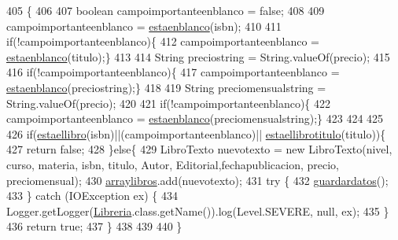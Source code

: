 \begin{DoxyCode}
405                                                                                                            
                     \{
406              
407              \textcolor{keywordtype}{boolean} campoimportanteenblanco = \textcolor{keyword}{false};
408              
409              campoimportanteenblanco = \mbox{\hyperlink{classlibreria_1_1_libreria_afca98a0ea16507ff5cc9bc0dde706abb}{estaenblanco}}(isbn);
410              
411              \textcolor{keywordflow}{if}(!campoimportanteenblanco)\{
412              campoimportanteenblanco = \mbox{\hyperlink{classlibreria_1_1_libreria_afca98a0ea16507ff5cc9bc0dde706abb}{estaenblanco}}(titulo);\}
413              
414              String preciostring = String.valueOf(precio);
415              
416              \textcolor{keywordflow}{if}(!campoimportanteenblanco)\{
417              campoimportanteenblanco = \mbox{\hyperlink{classlibreria_1_1_libreria_afca98a0ea16507ff5cc9bc0dde706abb}{estaenblanco}}(preciostring);\}
418              
419              String preciomensualstring = String.valueOf(precio);
420              
421              \textcolor{keywordflow}{if}(!campoimportanteenblanco)\{
422              campoimportanteenblanco = \mbox{\hyperlink{classlibreria_1_1_libreria_afca98a0ea16507ff5cc9bc0dde706abb}{estaenblanco}}(preciomensualstring);\}
423              
424              
425                  
426             \textcolor{keywordflow}{if}(\mbox{\hyperlink{classlibreria_1_1_libreria_a0af77d7fa2b6f3c0a0b218ee9df08ce3}{estaellibro}}(isbn)||(campoimportanteenblanco)||
      \mbox{\hyperlink{classlibreria_1_1_libreria_aec6380fd1bcff89fb0f2d6d4b4584598}{estaellibrotitulo}}(titulo))\{
427                 \textcolor{keywordflow}{return} \textcolor{keyword}{false};
428             \}\textcolor{keywordflow}{else}\{
429                 LibroTexto nuevotexto = \textcolor{keyword}{new} LibroTexto(nivel, curso, materia, isbn, titulo, Autor, 
      Editorial,fechapublicacion, precio, preciomensual);
430                 \mbox{\hyperlink{classlibreria_1_1_libreria_aa55c2bad2db92eb94ea1ba9c6997f47d}{arraylibros}}.add(nuevotexto);
431                  \textcolor{keywordflow}{try} \{
432                      \mbox{\hyperlink{classlibreria_1_1_libreria_abc10249e70e74a9ba55a081bbf23cfcd}{guardardatos}}();
433                  \} \textcolor{keywordflow}{catch} (IOException ex) \{
434                      Logger.getLogger(\mbox{\hyperlink{classlibreria_1_1_libreria_a93220dd4de47ee3b7ef4b2a90701c253}{Libreria}}.class.getName()).log(Level.SEVERE, null, ex);
435                  \}
436                 \textcolor{keywordflow}{return} \textcolor{keyword}{true};
437             \}
438          
439          
440      \}
\end{DoxyCode}



